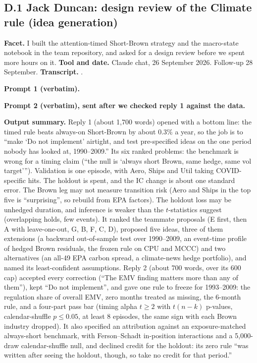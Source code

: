 \subsection*{D.1 Jack Duncan: design review of the Climate rule (idea generation)}

\textbf{Facet.} I built the attention-timed Short-Brown strategy and the macro-state notebook in the team repository, and asked for a design review before we spent more hours on it. \textbf{Tool and date.} Claude chat, 26 September 2026. Follow-up 28 September. \textbf{Transcript.} .

\textbf{Prompt 1 (verbatim).}
\begin{promptbox}

\end{promptbox}

\textbf{Prompt 2 (verbatim), sent after we checked reply 1 against the data.}
\begin{promptbox}

\end{promptbox}

\textbf{Output summary.} Reply 1 (about 1,700 words) opened with a bottom line: the timed rule beats always-on Short-Brown by about 0.3\% a year, so the job is to ``make `Do not implement' airtight, and test pre-specified ideas on the one period nobody has looked at, 1990--2009.'' Its six ranked problems: the benchmark is wrong for a timing claim (``the null is `always short Brown, same hedge, same vol target'''). Validation is one episode, with Aero, Ships and Util taking COVID-specific hits. The holdout is spent, and the IC change is about one standard error. The Brown leg may not measure transition risk (Aero and Ships in the top five is ``surprising'', so rebuild from EPA factors). The holdout loss may be unhedged duration, and inference is weaker than the $t$-statistics suggest (overlapping holds, few events). It ranked the teammate proposals (E first, then A with leave-one-out, G, B, F, C, D), proposed five ideas, three of them extensions (a backward out-of-sample test over 1990--2009, an event-time profile of hedged Brown residuals, the frozen rule on CPU and MCCC) and two alternatives (an all-49 EPA carbon spread, a climate-news hedge portfolio), and named its least-confident assumptions. Reply 2 (about 700 words, over its 600 cap) accepted every correction (``The EMV finding matters more than any of them''), kept ``Do not implement'', and gave one rule to freeze for 1993--2009: the regulation share of overall EMV, zero months treated as missing, the 6-month rule, and a four-part pass bar (timing alpha $t\geq2$ with $t(n-k)$ p-values, calendar-shuffle $p\leq0.05$, at least 8 episodes, the same sign with each Brown industry dropped). It also specified an attribution against an exposure-matched always-short benchmark, with Ferson--Schadt in-position interactions and a 5,000-draw calendar-shuffle null, and declined credit for the holdout: its zero rule ``was written after seeing the holdout, though, so take no credit for that period.''

